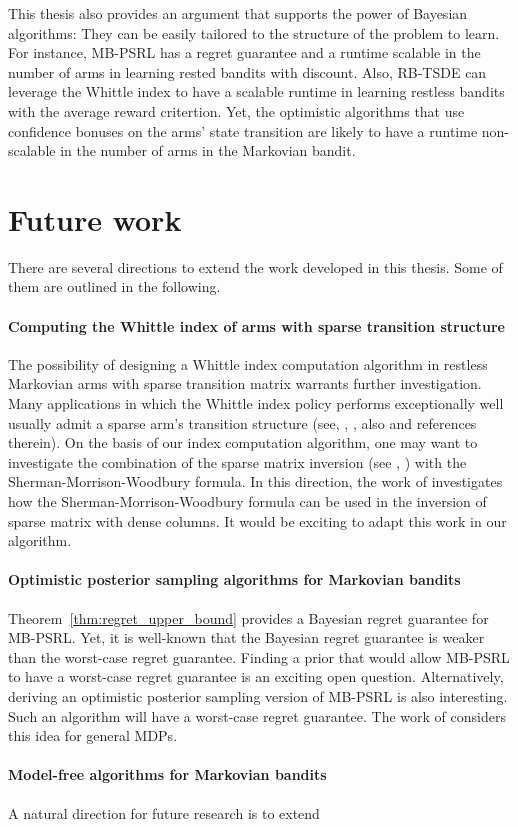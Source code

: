 This thesis also provides an argument that supports the power of Bayesian algorithms: They can be easily tailored to the structure of the problem to learn.
For instance, MB-PSRL has a regret guarantee and a runtime scalable in the number of arms in learning rested bandits with discount.
Also, RB-TSDE \cite{akbarzadeh2022learning} can leverage the Whittle index to have a scalable runtime in learning restless bandits with the average reward critertion.
Yet, the optimistic algorithms that use confidence bonuses on the arms' state transition are likely to have a runtime non-scalable in the number of arms in the Markovian bandit.


\section{Future work}

There are several directions to extend the work developed in this thesis. Some of them are outlined in the following.

\paragraph{Computing the Whittle index of arms with sparse transition structure}

The possibility of designing a Whittle index computation algorithm in restless Markovian arms with sparse transition matrix warrants further investigation.
Many applications in which the Whittle index policy performs exceptionally well usually admit a sparse arm's transition structure (see, \eg, \cite{wang1995finite, nino2002dynamic, aalto2018whittle}, also \cite{wang2020restless} and references therein).
On the basis of our index computation algorithm, one may want to investigate the combination of the sparse matrix inversion (see \eg, \cite{dulmage1962inversion, niessner1983computing}) with the Sherman-Morrison-Woodbury formula.
In this direction, the work of \cite{vanderbei1991splitting} investigates how the Sherman-Morrison-Woodbury formula can be used in the inversion of sparse matrix with dense columns.
It would be exciting to adapt this work in our algorithm.

\paragraph{Optimistic posterior sampling algorithms for Markovian bandits}

Theorem~\ref{thm:regret_upper_bound} provides a Bayesian regret guarantee for MB-PSRL.
Yet, it is well-known that the Bayesian regret guarantee is weaker than the worst-case regret guarantee.
Finding a prior that would allow MB-PSRL to have a worst-case regret guarantee is an exciting open question. 
Alternatively, deriving an optimistic posterior sampling version of MB-PSRL is also interesting.
Such an algorithm will have a worst-case regret guarantee.
The work of \cite{ishfaq2021randomized,agrawal2021improved,wang2020reinforcement,agrawal2017posterior} considers this idea for general MDPs.

\paragraph{Model-free algorithms for Markovian bandits}

A natural direction for future research is to extend 

\endgroup
